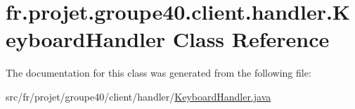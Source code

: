 \hypertarget{classfr_1_1projet_1_1groupe40_1_1client_1_1handler_1_1_keyboard_handler}{}\section{fr.\+projet.\+groupe40.\+client.\+handler.\+Keyboard\+Handler Class Reference}
\label{classfr_1_1projet_1_1groupe40_1_1client_1_1handler_1_1_keyboard_handler}


The documentation for this class was generated from the following file\+:\begin{DoxyCompactItemize}
\item 
src/fr/projet/groupe40/client/handler/\hyperlink{_keyboard_handler_8java}{Keyboard\+Handler.\+java}\end{DoxyCompactItemize}
